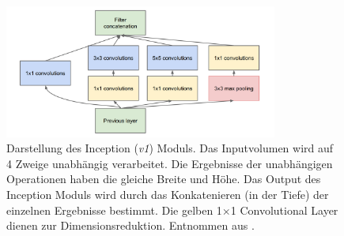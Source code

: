 \vspace*{\fill}
 \begin{figure}[H]
	\centering
	\includegraphics[width=0.8\textwidth]{images/googlenet/inception_module.png}
	\caption{Darstellung des Inception (\textit{v1}) Moduls. Das Inputvolumen wird auf 4 Zweige unabhängig verarbeitet. Die Ergebnisse der unabhängigen Operationen haben die gleiche Breite und Höhe. Das Output des Inception Moduls wird durch das Konkatenieren (in der Tiefe) der einzelnen Ergebnisse bestimmt. Die gelben 1$\times$1 Convolutional Layer dienen zur Dimensionsreduktion. Entnommen aus \cite{szegedyGoingDeeperConvolutions2015}.}
	\label{fig:inception_module}
\end{figure}
\vspace*{\fill}
\pagebreak

